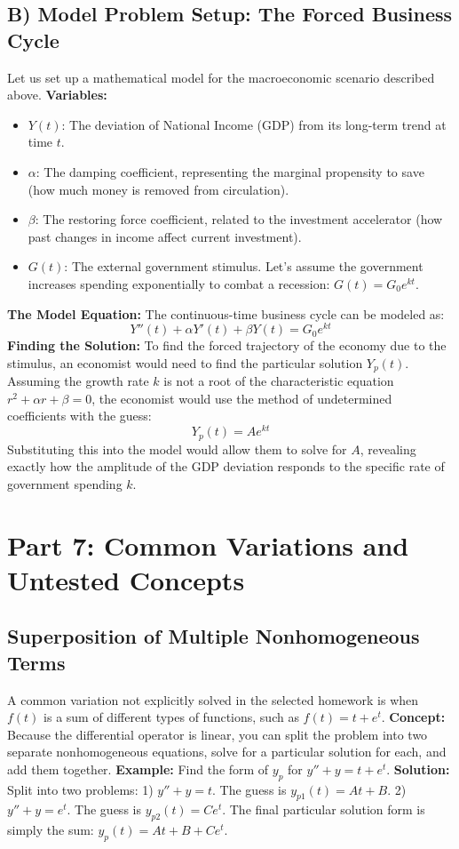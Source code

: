 \documentclass[12pt]{article}
\begin{document}
\subsection{B) Model Problem Setup: The Forced Business Cycle}
Let us set up a mathematical model for the macroeconomic scenario described above.
\textbf{Variables:}
\begin{itemize}
    \item $Y(t)$: The deviation of National Income (GDP) from its long-term trend at time $t$.
    \item $\alpha$: The damping coefficient, representing the marginal propensity to save (how much money is removed from circulation).
    \item $\beta$: The restoring force coefficient, related to the investment accelerator (how past changes in income affect current investment).
    \item $G(t)$: The external government stimulus. Let's assume the government increases spending exponentially to combat a recession: $G(t) = G_0 e^{kt}$.
\end{itemize}
\textbf{The Model Equation:}
The continuous-time business cycle can be modeled as:
\[ Y''(t) + \alpha Y'(t) + \beta Y(t) = G_0 e^{kt} \]
\textbf{Finding the Solution:}
To find the forced trajectory of the economy due to the stimulus, an economist would need to find the particular solution $Y_p(t)$. Assuming the growth rate $k$ is not a root of the characteristic equation $r^2 + \alpha r + \beta = 0$, the economist would use the method of undetermined coefficients with the guess:
\[ Y_p(t) = A e^{kt} \]
Substituting this into the model would allow them to solve for $A$, revealing exactly how the amplitude of the GDP deviation responds to the specific rate of government spending $k$.

\newpage
\section{Part 7: Common Variations and Untested Concepts}

\subsection{Superposition of Multiple Nonhomogeneous Terms}
A common variation not explicitly solved in the selected homework is when $f(t)$ is a sum of different types of functions, such as $f(t) = t + e^t$. 
\textbf{Concept:} Because the differential operator is linear, you can split the problem into two separate nonhomogeneous equations, solve for a particular solution for each, and add them together.
\textbf{Example:} Find the form of $y_p$ for $y'' + y = t + e^t$.
\textbf{Solution:} 
Split into two problems:
1) $y'' + y = t$. The guess is $y_{p1}(t) = At + B$.
2) $y'' + y = e^t$. The guess is $y_{p2}(t) = C e^t$.
The final particular solution form is simply the sum: $y_p(t) = At + B + C e^t$.
\end{document}
